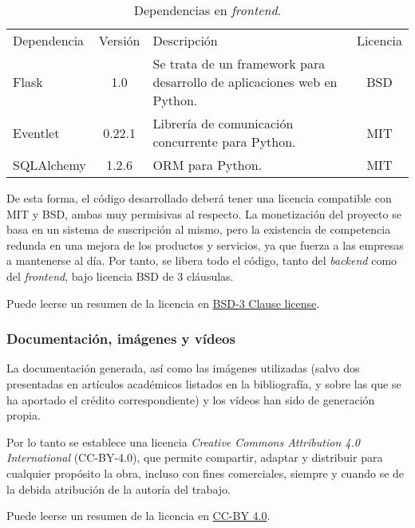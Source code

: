 \begin{table}
\begin{center}
		\begin{tabular}{l  c m{6cm}  c}\hline
			\toprule
			Dependencia & Versión & Descripción & Licencia\\
			\otoprule
			Flask & 1.0 & Se trata de un framework para desarrollo de aplicaciones web en Python.  & BSD  \\
			Eventlet & 0.22.1 & Librería de comunicación concurrente para Python.  & MIT\\
			SQLAlchemy & 1.2.6 & ORM para Python. & MIT\\
			\hline
			\bottomrule
		\end{tabular}
		\caption{Dependencias en \emph{frontend}.}
		\label{tb:licensefrontend}
		\end{center}
\end{table}

De esta forma, el código desarrollado deberá tener una licencia compatible con MIT y BSD, ambas muy permisivas al respecto. 
La monetización del proyecto se basa en un sistema de suscripción al mismo, pero la existencia de competencia redunda en una mejora de los productos y servicios, ya que fuerza a las empresas a mantenerse al día.
Por tanto, se libera todo el código, tanto del \emph{backend} como del \emph{frontend}, bajo licencia BSD de 3 cláusulas.

Puede leerse un resumen de la licencia en \href{https://opensource.org/licenses/BSD-3-Clause}{BSD-3 Clause license}.

\subsubsection{Documentación, imágenes y vídeos}

La documentación generada, así como las imágenes utilizadas (salvo dos presentadas en artículos académicos listados en la bibliografía, y sobre las que se ha aportado el crédito correspondiente) y los vídeos han sido de generación propia. 

Por lo tanto se establece una licencia \emph{Creative Commons Attribution 4.0 International} (CC-BY-4.0), que permite compartir, adaptar y distribuir para cualquier propósito la obra, incluso con fines comerciales, siempre y cuando se de la debida atribución de la autoría del trabajo.

Puede leerse un resumen de la licencia en \href{https://creativecommons.org/licenses/by/4.0/}{CC-BY 4.0}. 



